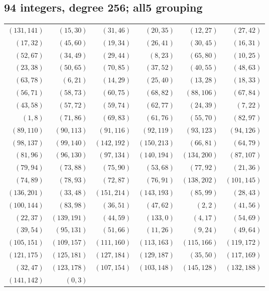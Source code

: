 \subsection*{94 integers, degree 256; all5 grouping}
\begingroup\small
\begin{longtable}{rrrrrr}
$(131,141)$ & $(15,30)$ & $(31,46)$ & $(20,35)$ & $(12,27)$ & $(27,42)$\\
$(17,32)$ & $(45,60)$ & $(19,34)$ & $(26,41)$ & $(30,45)$ & $(16,31)$\\
$(52,67)$ & $(34,49)$ & $(29,44)$ & $(8,23)$ & $(65,80)$ & $(10,25)$\\
$(23,38)$ & $(50,65)$ & $(70,85)$ & $(37,52)$ & $(40,55)$ & $(48,63)$\\
$(63,78)$ & $(6,21)$ & $(14,29)$ & $(25,40)$ & $(13,28)$ & $(18,33)$\\
$(56,71)$ & $(58,73)$ & $(60,75)$ & $(68,82)$ & $(88,106)$ & $(67,84)$\\
$(43,58)$ & $(57,72)$ & $(59,74)$ & $(62,77)$ & $(24,39)$ & $(7,22)$\\
$(1,8)$ & $(71,86)$ & $(69,83)$ & $(61,76)$ & $(55,70)$ & $(82,97)$\\
$(89,110)$ & $(90,113)$ & $(91,116)$ & $(92,119)$ & $(93,123)$ & $(94,126)$\\
$(98,137)$ & $(99,140)$ & $(142,192)$ & $(150,213)$ & $(66,81)$ & $(64,79)$\\
$(81,96)$ & $(96,130)$ & $(97,134)$ & $(140,194)$ & $(134,200)$ & $(87,107)$\\
$(79,94)$ & $(73,88)$ & $(75,90)$ & $(53,68)$ & $(77,92)$ & $(21,36)$\\
$(74,89)$ & $(78,93)$ & $(72,87)$ & $(76,91)$ & $(138,202)$ & $(101,145)$\\
$(136,201)$ & $(33,48)$ & $(151,214)$ & $(143,193)$ & $(85,99)$ & $(28,43)$\\
$(100,144)$ & $(83,98)$ & $(36,51)$ & $(47,62)$ & $(2,2)$ & $(41,56)$\\
$(22,37)$ & $(139,191)$ & $(44,59)$ & $(133,0)$ & $(4,17)$ & $(54,69)$\\
$(39,54)$ & $(95,131)$ & $(51,66)$ & $(11,26)$ & $(9,24)$ & $(49,64)$\\
$(105,151)$ & $(109,157)$ & $(111,160)$ & $(113,163)$ & $(115,166)$ & $(119,172)$\\
$(121,175)$ & $(125,181)$ & $(127,184)$ & $(129,187)$ & $(35,50)$ & $(117,169)$\\
$(32,47)$ & $(123,178)$ & $(107,154)$ & $(103,148)$ & $(145,128)$ & $(132,188)$\\
$(141,142)$ & $(0,3)$ & & & &\\
\end{longtable}
\endgroup
